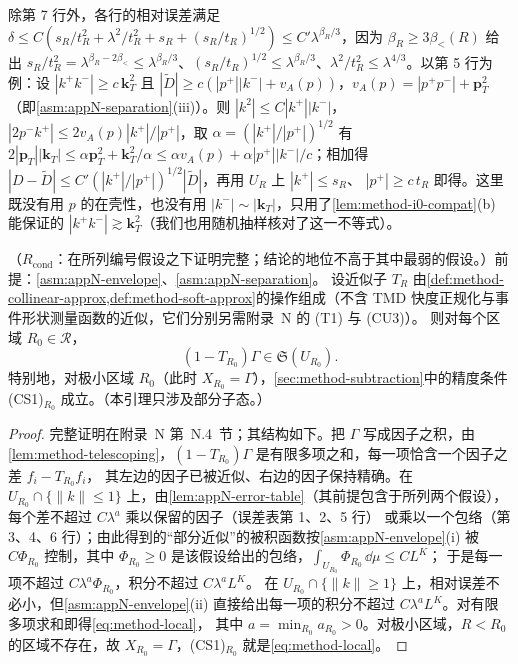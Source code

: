 除第 7 行外，各行的相对误差满足 $\delta\le C(s_R/t_R^2+\lambda^2/t_R^2+s_R+(s_R/t_R)^{1/2})\le C'\lambda^{\beta_R/3}$，因为 $\beta_R\ge3\beta_<(R)$ 给出
$s_R/t_R^2=\lambda^{\beta_R-2\beta_<}\le\lambda^{\beta_R/3}$、$(s_R/t_R)^{1/2}\le\lambda^{\beta_R/3}$、$\lambda^2/t_R^2\le\lambda^{4/3}$。以第 5 行为例：设 $|k^+k^-|\ge c\,\mathbf k_T^2$ 且
$|\tilde D|\ge c(|p^+||k^-|+v_A(p))$，$v_A(p)=|p^+p^-|+\mathbf p_T^2$（即\cref{asm:appN-separation}(iii)）。则 $|k^2|\le C|k^+||k^-|$，$|2p^-k^+|\le2v_A(p)|k^+|/|p^+|$，取 $\alpha=(|k^+|/|p^+|)^{1/2}$ 有
$2|\mathbf p_T||\mathbf k_T|\le\alpha\mathbf p_T^2+\mathbf k_T^2/\alpha\le\alpha v_A(p)+\alpha|p^+||k^-|/c$；相加得 $|D-\tilde D|\le C'(|k^+|/|p^+|)^{1/2}|\tilde D|$，再用 $U_R$ 上 $|k^+|\le s_R$、
$|p^+|\ge c\,t_R$ 即得。这里既没有用 $p$ 的在壳性，也没有用 $|k^-|\sim|\mathbf k_T|$，只用了\cref{lem:method-i0-compat}(b) 能保证的 $|k^+k^-|\gtrsim\mathbf k_T^2$（我们也用随机抽样核对了这一不等式）。%

\begin{lemma}\label{lem:method-local-accuracy}
（$R_{\mathrm{cond}}$：在所列编号假设之下证明完整；结论的地位不高于其中最弱的假设。）前提：\cref{asm:appN-envelope}、\cref{asm:appN-separation}。
设近似子 $T_R$ 由\cref{def:method-collinear-approx,def:method-soft-approx}的操作组成（不含 TMD 快度正规化与事件形状测量函数的近似，它们分别另需附录~N 的 (T1) 与 (CU3)）。
则对每个区域 $R_0\in\mathcal R$，
\begin{equation}\label{eq:method-local}
(1-T_{R_0})\Gamma\in\mathfrak S(U_{R_0}) .
\end{equation}
特别地，对极小区域 $R_0$（此时 $X_{R_0}=\Gamma$），\cref{sec:method-subtraction}中的精度条件 (CS1)$_{R_0}$ 成立。（本引理只涉及部分子态。）
\end{lemma}

\begin{proof}
完整证明在附录~N 第~N.4~节；其结构如下。把 $\Gamma$ 写成因子之积，由\cref{lem:method-telescoping}，$(1-T_{R_0})\Gamma$ 是有限多项之和，每一项恰含一个因子之差 $f_i-T_{R_0}f_i$，
其左边的因子已被近似、右边的因子保持精确。在 $U_{R_0}\cap\{\|k\|\le1\}$ 上，由\cref{lem:appN-error-table}（其前提包含于所列两个假设），每个差不超过 $C\lambda^a$ 乘以保留的因子（误差表第 1、2、5 行）
或乘以一个包络（第 3、4、6 行）；由此得到的“部分近似”的被积函数按\cref{asm:appN-envelope}(i) 被 $C\Phi_{R_0}$ 控制，其中 $\Phi_{R_0}\ge0$ 是该假设给出的包络，$\int_{U_{R_0}}\Phi_{R_0}\,\dd\mu\le CL^K$；
于是每一项不超过 $C\lambda^a\Phi_{R_0}$，积分不超过 $C\lambda^aL^K$。
在 $U_{R_0}\cap\{\|k\|\ge1\}$ 上，相对误差不必小，但\cref{asm:appN-envelope}(ii) 直接给出每一项的积分不超过 $C\lambda^aL^K$。对有限多项求和即得\cref{eq:method-local}，
其中 $a=\min_{R_0}a_{R_0}>0$。对极小区域，$R<R_0$ 的区域不存在，故 $X_{R_0}=\Gamma$，(CS1)$_{R_0}$ 就是\cref{eq:method-local}。
\end{proof}

